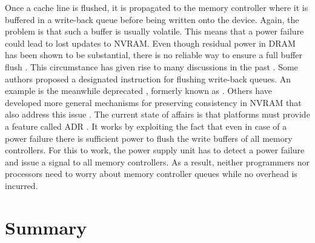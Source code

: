 
Once a cache line is flushed, it is propagated to the memory controller where it
is buffered in a write-back queue before being written onto the device. Again,
the problem is that such a buffer is usually volatile. This means that a power
failure could lead to lost updates to NVRAM. Even though residual power in DRAM
has been shown to be substantial, there is no reliable way to ensure a full
buffer flush \cite{halderman2008lest}. This circumstance has given rise to many
discussions in the past \cite{condit2009better, dulloor2014system,
kolli2016high}. Some authors proposed a designated instruction for flushing
write-back queues. An example is the meanwhile deprecated ,
formerly known as  \cite{dulloor2014system, oukid2015instant,
schwalb2015nvm_malloc, volos2017whisper}. Others have developed more general
mechanisms for preserving consistency in NVRAM that also address this issue
\cite{condit2009better, pelley2014memory}. The current state of affairs is
that platforms must provide a feature called ADR \cite{volos2017whisper}. It
works by exploiting the fact that even in case of a power failure there is
sufficient power to flush the write buffers of all memory controllers. For this
to work, the power supply unit has to detect a power failure and issue a signal
to all memory controllers. As a result, neither programmers nor processors need to worry about memory controller queues while no overhead is incurred.

\section{Summary}

